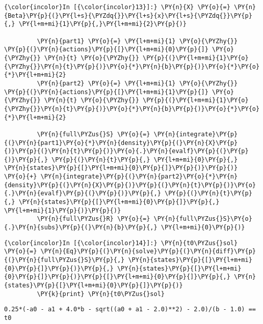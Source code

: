     \begin{Verbatim}[commandchars=\\\{\}]
{\color{incolor}In [{\color{incolor}13}]:} \PY{n}{X} \PY{o}{=} \PY{n}{Beta}\PY{p}{(}\PY{l+s}{\PYZdq{}}\PY{l+s}{x}\PY{l+s}{\PYZdq{}}\PY{p}{,} \PY{l+m+mi}{1}\PY{p}{,}\PY{l+m+mi}{2}\PY{p}{)}
         
         \PY{n}{part1} \PY{o}{=} \PY{l+m+mi}{1} \PY{o}{\PYZhy{}} \PY{p}{(}\PY{n}{actions}\PY{p}{[}\PY{l+m+mi}{0}\PY{p}{]} \PY{o}{\PYZhy{}} \PY{n}{t} \PY{o}{\PYZhy{}} \PY{p}{(}\PY{l+m+mi}{1}\PY{o}{\PYZhy{}}\PY{n}{t}\PY{p}{)}\PY{o}{*}\PY{n}{b}\PY{p}{)}\PY{o}{*}\PY{o}{*}\PY{l+m+mi}{2}
         \PY{n}{part2} \PY{o}{=} \PY{l+m+mi}{1} \PY{o}{\PYZhy{}} \PY{p}{(}\PY{n}{actions}\PY{p}{[}\PY{l+m+mi}{1}\PY{p}{]} \PY{o}{\PYZhy{}} \PY{n}{t} \PY{o}{\PYZhy{}} \PY{p}{(}\PY{l+m+mi}{1}\PY{o}{\PYZhy{}}\PY{n}{t}\PY{p}{)}\PY{o}{*}\PY{n}{b}\PY{p}{)}\PY{o}{*}\PY{o}{*}\PY{l+m+mi}{2}
         
         \PY{n}{full\PYZus{}S} \PY{o}{=} \PY{n}{integrate}\PY{p}{(}\PY{n}{part1}\PY{o}{*}\PY{n}{density}\PY{p}{(}\PY{n}{X}\PY{p}{)}\PY{p}{(}\PY{n}{t}\PY{p}{)}\PY{o}{.}\PY{n}{evalf}\PY{p}{(}\PY{p}{)}\PY{p}{,} \PY{p}{(}\PY{n}{t}\PY{p}{,} \PY{l+m+mi}{0}\PY{p}{,} \PY{n}{states}\PY{p}{[}\PY{l+m+mi}{0}\PY{p}{]}\PY{p}{)}\PY{p}{)} \PY{o}{+} \PY{n}{integrate}\PY{p}{(}\PY{n}{part2}\PY{o}{*}\PY{n}{density}\PY{p}{(}\PY{n}{X}\PY{p}{)}\PY{p}{(}\PY{n}{t}\PY{p}{)}\PY{o}{.}\PY{n}{evalf}\PY{p}{(}\PY{p}{)}\PY{p}{,} \PY{p}{(}\PY{n}{t}\PY{p}{,} \PY{n}{states}\PY{p}{[}\PY{l+m+mi}{0}\PY{p}{]}\PY{p}{,} \PY{l+m+mi}{1}\PY{p}{)}\PY{p}{)}
         \PY{n}{full\PYZus{}R} \PY{o}{=} \PY{n}{full\PYZus{}S}\PY{o}{.}\PY{n}{subs}\PY{p}{(}\PY{n}{b}\PY{p}{,} \PY{l+m+mi}{0}\PY{p}{)}
\end{Verbatim}

    \begin{Verbatim}[commandchars=\\\{\}]
{\color{incolor}In [{\color{incolor}14}]:} \PY{n}{t0\PYZus{}sol} \PY{o}{=} \PY{n}{Eq}\PY{p}{(}\PY{n}{solve}\PY{p}{(}\PY{n}{diff}\PY{p}{(}\PY{n}{full\PYZus{}S}\PY{p}{,} \PY{n}{states}\PY{p}{[}\PY{l+m+mi}{0}\PY{p}{]}\PY{p}{)}\PY{p}{,} \PY{n}{states}\PY{p}{[}\PY{l+m+mi}{0}\PY{p}{]}\PY{p}{)}\PY{p}{[}\PY{l+m+mi}{0}\PY{p}{]}\PY{p}{,} \PY{n}{states}\PY{p}{[}\PY{l+m+mi}{0}\PY{p}{]}\PY{p}{)}
         \PY{k}{print} \PY{n}{t0\PYZus{}sol}
\end{Verbatim}

    \begin{Verbatim}[commandchars=\\\{\}]
0.25*(-a0 - a1 + 4.0*b - sqrt((a0 + a1 - 2.0)**2) - 2.0)/(b - 1.0) == t0
    \end{Verbatim}

